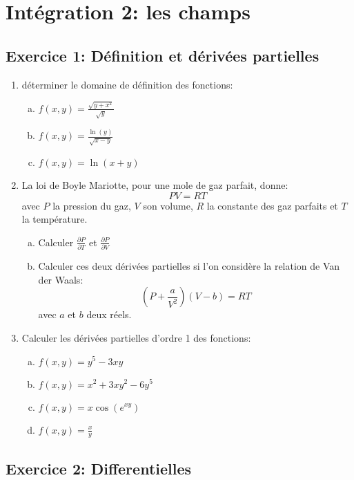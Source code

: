 \chapter{Intégration 2: les champs}

\section*{Exercice 1: Définition et dérivées partielles}
\begin{enumerate}
    \item  déterminer le domaine de définition des fonctions:
    \begin{enumerate}[a)]
        \item $f(x, y)=\frac{\sqrt{y+x^2}}{\sqrt{y}}$
        \item $f(x, y)=\frac{\ln (y)}{\sqrt{x-y}}$
        \item $f(x, y)=\ln (x+y)$
    \end{enumerate}
    \item  La loi de Boyle Mariotte, pour une mole de gaz parfait, donne:
    $$
    P V=R T
    $$
    avec $P$ la pression du gaz, $V$ son volume, $R$ la constante des gaz parfaits et $T$ la température.
    \begin{enumerate}[a)]
        \item Calculer $\frac{\partial P}{\partial T}$ et $\frac{\partial P}{\partial V}$
        \item Calculer ces deux dérivées partielles si l'on considère la relation de Van der Waals:
        $$
        \left(P+\frac{a}{V^2}\right)(V-b)=R T
        $$
        avec $a$ et $b$ deux réels.
    \end{enumerate}
    \item Calculer les dérivées partielles d'ordre 1 des fonctions:
    \begin{enumerate}[a)]
        \item $f(x, y)=y^5-3 x y$
        \item $f(x, y)=x^2+3 x y^2-6 y^5$
        \item $f(x, y)=x \cos \left(e^{x y}\right)$
        \item $f(x, y)=\frac{x}{y}$
    \end{enumerate}
\end{enumerate}

\section*{Exercice 2: Differentielles}

